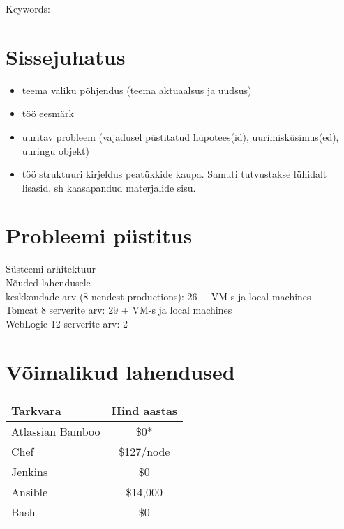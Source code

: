 \documentclass[12pt]{report}
\renewcommand{\headrulewidth}{0pt}
\begin{document}
  Keywords:
  
  \newpage
 
  \tableofcontents
  \fancypagestyle{plain}{%
    \renewcommand{\headrulewidth}{0pt}%
    \fancyhf{}%
    \fancyfoot[R]{\thepage}%
}
 
  \newpage
  
  \section*{Sissejuhatus}
  \label{sissejuhatus}
  
  \begin{itemize}
    \item teema valiku põhjendus (teema aktuaalsus ja uudsus)
    \item töö eesmärk
    \item  uuritav probleem (vajadusel püstitatud hüpotees(id), uurimisküsimus(ed), uuringu objekt)
    \item töö struktuuri kirjeldus peatükkide kaupa. Samuti tutvustakse lühidalt lisasid, sh kaasapandud
materjalide sisu.
  \end{itemize}
  
  \newpage
  
  \section{Probleemi püstitus}
  
  Süsteemi arhitektuur\\
  Nõuded lahendusele\\
  
  keskkondade arv (8 nendest productions): 26 + VM-s ja local machines\\
  Tomcat 8 serverite arv: 29 + VM-s ja local machines\\
  WebLogic 12 serverite arv: 2\\
  
  \newpage
  
  \section{Võimalikud lahendused}
  
  \begin{tabular}{| l | c |}
    \hline
    Tarkvara & Hind aastas\\
    \hline
    Atlassian Bamboo & \$0*\\
    Chef & \$127/node\\
    Jenkins & \$0\\
    Ansible & \$14,000\\
    Bash & \$0\\
    \hline
  \end{tabular}
\end{document}
